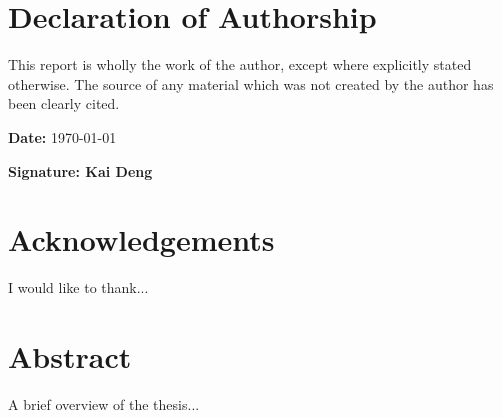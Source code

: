 \documentclass[12pt,a4paper]{report}
\begin{document}
\onehalfspacing

\chapter*{Declaration of Authorship}

This report is wholly the work of the author, except where explicitly
stated otherwise. The source of any material which was not created
by the author has been clearly cited. \\
\medskip{}

\textbf{Date:} \quad \today

\medskip{}

\textbf{Signature: Kai Deng} 

\chapter*{Acknowledgements}

I would like to thank...

\chapter*{Abstract}

A brief overview of the thesis...

\tableofcontents{}

\listoffigures{}

\newpage


\newpage


\newpage


\newpage


\newpage


\newpage
\appendix




\end{document}
